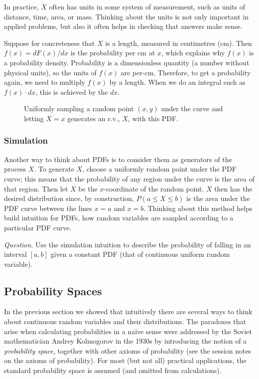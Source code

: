 \documentclass[11pt,a4paper]{article}
\begin{document}
In practice, 
\(X\) often has units in some system of measurement, 
such as units of distance, time, area, or mass. 
Thinking about the units is not only important in applied problems, 
but also it often helps in checking that answers make sense.

Suppose for concreteness that \(X\) is a length, 
measured in centimetres (cm). 
Then \(f(x) = dF(x)/dx\) is the probability per cm at \(x\), 
which explains why \(f(x)\) is a probability density. 
Probability is a dimensionless quantity (a number without physical units), 
so the units of \(f(x)\) are per-cm. 
Therefore, to get a probability again, 
we need to multiply \(f(x)\) by a length. 
When we do an integral such as \(f(x) \cdot dx\), 
this is achieved by the \(dx\).

\begin{figure}[h!]
\centering

\caption{%
Uniformly sampling a random point \((x,y)\) under the curve 
and letting \(X=x\) generates an r.v., \(X\), with this PDF.
}
\label{fig:generator}
\end{figure}

\subsubsection{Simulation} 

Another way to think about PDFs is to consider them as generators of the process \(X\). 
To generate \(X\), 
choose a uniformly random point under the PDF curve;
this means that the probability of any region under the curve is the area of that region. 
Then let \(X\) be the \(x\)-coordinate of the random point. 
\(X\) then has the desired distribution since, 
by construction, 
\(P(a \leq X \leq b)\) is the area under the PDF curve 
between the lines \(x = a\) and \(x = b\). 
Thinking about this method helps build intuition for PDFs, 
how random variables are sampled according to a particular PDF curve.

\emph{Question}. 
Use the simulation intuition to describe the 
probability of falling in an interval \([a, b]\) given a
constant PDF (that of continuous uniform random variable).

\subsection{Probability Spaces}

In the previous section we showed that 
intuitively there are several ways to think about 
continuous random variables and their distributions.
The paradoxes that arise when calculating probabilities in a naïve sense
were addressed by the Soviet mathematician Andrey Kolmogorov in the
1930s by introducing the notion of a \emph{probability space}, 
together with other axioms of probability 
(see the session notes on the axioms of probability). 
For most (but not all) practical applications, 
the standard probability space is assumed (and omitted from calculations).
\end{document}
